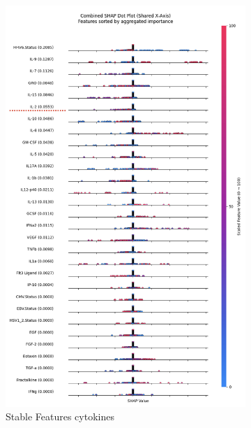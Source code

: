 \documentclass[12pt,a4paper]{report}
\begin{document}
\begin{figure}[h!]
    \begin{subfigure}[b]{0.48\textwidth}
        \centering
        \includegraphics[width=\textwidth]{images/stable_features_cytokines.png}
        \caption{Stable Features cytokines}
        \label{fig:stable_features_cytokines}
    \end{subfigure}
    \hfill
    \begin{subfigure}[b]{0.48\textwidth}
        \centering

\end{subfigure}
\end{figure}
\end{document}
